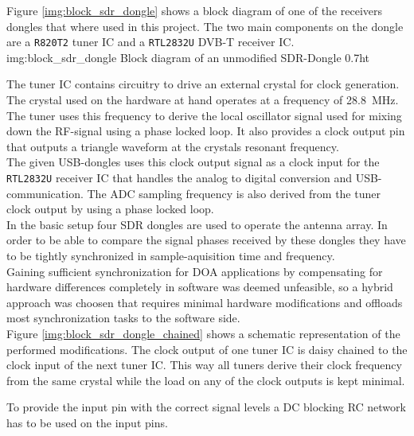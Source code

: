 Figure \ref{img:block_sdr_dongle} shows a block
diagram of one of the receivers dongles that where used
in this project.
The two main components on the dongle are a \texttt{R820T2} tuner IC
and a \texttt{RTL2832U} DVB-T receiver IC. \\

             {img:block_sdr_dongle}
             {Block diagram of an unmodified SDR-Dongle}
             {0.7}{ht}

The tuner IC contains circuitry to drive an
external crystal for clock generation.
The crystal used on the hardware at hand
operates at a frequency of \SI{28.8}{\mega\hertz}.
The tuner uses this frequency to derive the
local oscillator signal used for mixing down
the RF-signal using a phase locked loop.
It also provides a clock output pin that
outputs a triangle waveform at the crystals
resonant frequency. \\

The given USB-dongles uses this clock output signal
as a clock input for the \texttt{RTL2832U}
receiver IC that handles the analog to digital
conversion and USB-communication.
The ADC sampling frequency is also derived from
the tuner clock output by using a phase locked loop. \\

In the basic setup four SDR dongles are used
to operate the antenna array.
In order to be able to compare the signal phases
received by these dongles they have to be tightly
synchronized in sample-aquisition time and frequency. \\

Gaining sufficient synchronization for DOA applications
by compensating for hardware differences completely
in software was deemed unfeasible, so a hybrid
approach was choosen that requires minimal hardware
modifications and offloads most synchronization tasks
to the software side. \\


Figure \ref{img:block_sdr_dongle_chained} shows
a schematic representation of the performed modifications.
The clock output of one tuner IC is daisy chained to
the clock input of the next tuner IC.
This way all tuners derive their clock frequency
from the same crystal while the load on any of
the clock outputs is kept minimal.

To provide the input pin with the correct signal
levels a DC blocking RC network has to be used
on the input pins.

